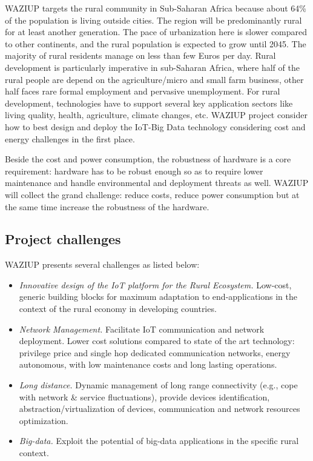 WAZIUP targets the rural community in Sub-Saharan Africa because about 64\% of the population is living outside cities.
The region will be predominantly rural for at least another generation.
The pace of urbanization here is slower compared to other continents, and the rural population is expected to grow until 2045.
The majority of rural residents manage on less than few Euros per day.
Rural development is particularly imperative in sub-Saharan Africa, where half of the rural people are depend on the agriculture/micro and small farm business, other half faces rare formal employment and pervasive unemployment.
For rural development, technologies have to support several key application sectors like living quality, health, agriculture, climate changes, etc.
WAZIUP project consider how to best design and deploy the IoT-Big Data technology considering cost and energy challenges in the first place.

Beside the cost and power consumption, the robustness of hardware is a core requirement: hardware has to be robust enough so as to require lower maintenance and handle environmental and deployment threats as well.
WAZIUP will collect the grand challenge: reduce costs, reduce power consumption but at the same time increase the robustness of the hardware.

\subsection{Project challenges}

WAZIUP presents several challenges as listed below:
\begin{itemize}
  \item \emph{Innovative design of the IoT platform for the Rural Ecosystem.} 
    Low-cost, generic building blocks for maximum adaptation to end-applications in the context of the rural economy in developing countries.
  \item \emph{Network Management.}
    Facilitate IoT communication and network deployment.
    Lower cost solutions compared to state of the art technology: privilege price and single hop dedicated communication networks, energy autonomous, with low maintenance costs and long lasting operations.
  \item \emph{Long distance.}
    Dynamic management of long range connectivity (e.g., cope with network \& service fluctuations), provide devices identification, abstraction/virtualization of devices, communication and network resources optimization.
  \item \emph{Big-data.}
    Exploit the potential of big-data applications in the specific rural context.
\end{itemize}

